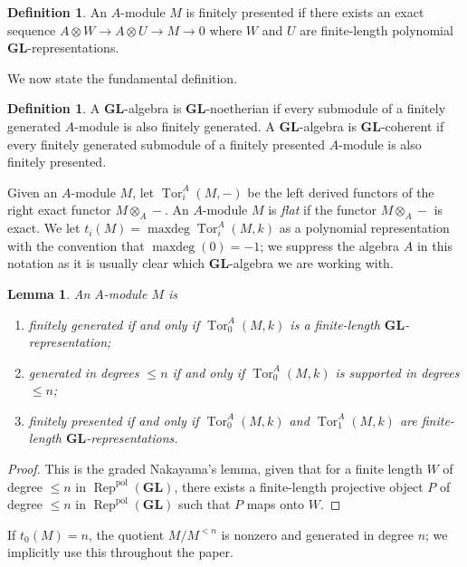 \documentclass[12pt]{amsart}
\DeclareMathOperator{\Tor}{Tor}
\newcommand{\pol}{\mathrm{pol}}
\DeclareMathOperator{\Rep}{Rep}
\DeclareMathOperator{\maxdeg}{{maxdeg}}
\newcommand{\GL}{\mathbf{GL}}
\numberwithin{equation}{section}
\newtheorem{lemma}[equation]{Lemma}
\theoremstyle{definition}
\newtheorem{defn}[equation]{Definition}
\theoremstyle{plain}
\begin{document}
\begin{defn}
 An $A$-module $M$ is finitely presented if there exists an exact sequence $A \otimes W \to A \otimes U \to M \to 0$ where $W$ and $U$ are finite-length polynomial $\GL$-representations.
\end{defn}

We now state the fundamental definition.
\begin{defn}
    A $\GL$-algebra is $\GL$-noetherian if every submodule of a finitely generated $A$-module is also finitely generated.
    A $\GL$-algebra is $\GL$-coherent if every finitely generated submodule of a finitely presented $A$-module is also finitely presented.
\end{defn}

Given an $A$-module $M$, let $\Tor_i^A(M, -)$ be the left derived functors of the right exact functor $M \otimes_A -$. An $A$-module $M$ is \textit{flat} if the functor $M \otimes_A -$ is exact. We let $t_i(M) = \maxdeg \Tor_i^A(M, k)$ as a polynomial representation with the convention that $\maxdeg(0) = -1$; we suppress the algebra $A$ in this notation as it is usually clear which $\GL$-algebra we are working with.


\begin{lemma}\label{lem:fptor}
    An $A$-module $M$ is
    \begin{enumerate}
        \item finitely generated if and only if $\Tor_0^A(M, k)$ is a finite-length $\GL$-representation; 
        \item generated in degrees $\leq n$ if and only if $\Tor_0^A(M,k)$ is supported in degrees $\leq n$;
        \item finitely presented if and only if $\Tor_0^A(M, k)$ and $\Tor_1^A(M,k)$ are finite-length $\GL$-representations.
    \end{enumerate}
\end{lemma}
\begin{proof}
This is the graded Nakayama's lemma, given that for a finite length $W$ of degree $\leq n$ in $\Rep^{\pol}(\GL)$, there exists a finite-length projective object $P$ of degree $\leq n$ in $\Rep^{\pol}(\GL)$ such that $P$ maps onto $W$. 
\end{proof}
If $t_0(M) = n$, the quotient $M/M^{<n}$ is nonzero and generated in degree $n$; we implicitly use this throughout the paper.
\end{document}
